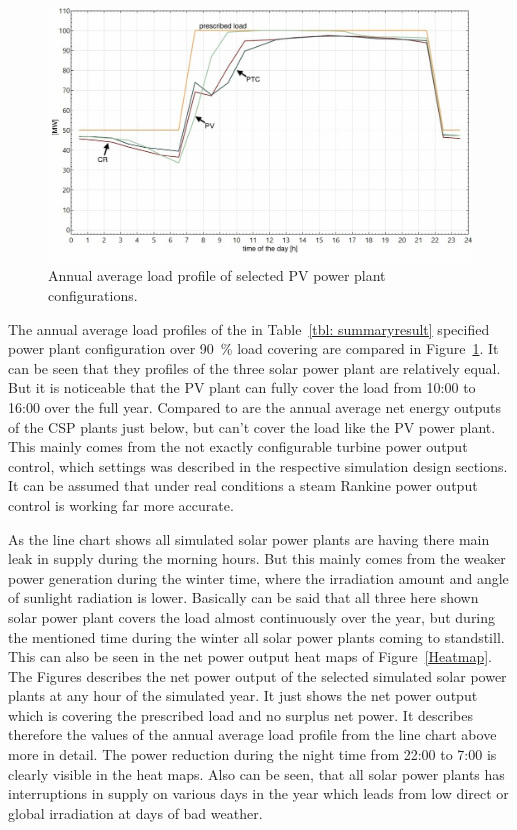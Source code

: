\begin{figure}[htbp]  
\centering
\includegraphics[width=0.8\linewidth]{FIG/90_annual_profil}
\caption[Annual average load profile of selected PV power plant configurations.]{Annual average load profile of selected PV power plant configurations.}\label{90_annual_profil}
\end{figure}
The annual average load profiles of the in Table~\ref{tbl: summaryresult} specified  power plant configuration over 90~\% load covering are compared in Figure~\ref{90_annual_profil}. It can be seen that they profiles of the three solar power plant are relatively equal. But it is noticeable that the PV plant can fully cover the load from 10:00 to 16:00 over the full year. Compared to are the annual average net energy outputs of the CSP plants just below, but can't cover the load like the PV power plant. This mainly comes from the not exactly configurable turbine power output control, which settings was described in the respective simulation design sections. It can be assumed that under real conditions a steam Rankine power output control is working far more accurate. 

As the line chart shows all simulated solar power plants are having there main leak in supply during the morning hours. But this mainly comes from the weaker power generation during the winter time, where the irradiation amount and angle of sunlight radiation is lower. Basically can be said that all three here shown solar power plant covers the load almost continuously over the year, but during the mentioned time during the winter all solar power plants coming to standstill. This can also be seen in the net power output heat maps of Figure~\ref{Heatmap}. The Figures describes the net power output of the selected simulated solar power plants at any hour of the simulated year. It just shows the net power output which is covering  the prescribed load and no surplus net power. It describes therefore the values of the annual average load profile from the line chart above more in detail. The power reduction during the night time from 22:00 to 7:00 is clearly visible in the heat maps. Also can be seen, that all solar power plants has interruptions in supply on various days in the year which leads from low direct or global irradiation at days of bad weather. 

